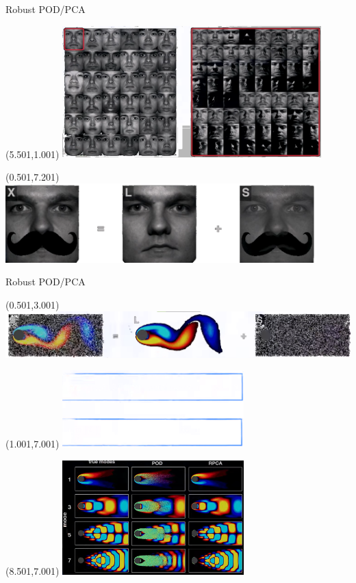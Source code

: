 \documentclass[aspectratio=169]{beamer}
\begin{document}
\begin{frame}{Robust POD/PCA}
\begin{textblock}{13}(5.501,1.001)
	\includegraphics[width=10cm]{imgs/faces2.png}
\end{textblock}
\begin{textblock}{13}(0.501,7.201)
	\includegraphics[width=12cm]{imgs/faces1.png}
\end{textblock}
\end{frame}

\begin{frame}{Robust POD/PCA}
	\begin{textblock}{13}(0.501,3.001)
		\includegraphics[width=15cm]{imgs/eigenflow.png}
	\end{textblock}
	\begin{textblock}{13}(1.001,7.001)
		\includegraphics[width=7cm]{imgs/eigenflow2.png}
	\end{textblock}
	\begin{textblock}{13}(8.501,7.001)
		\includegraphics[width=7cm]{imgs/rpca.png}
	\end{textblock}
\end{frame}
\end{document}
